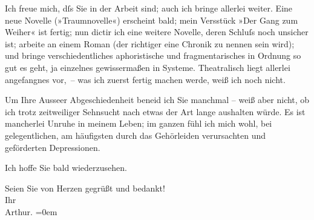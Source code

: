 \pstart
           Ich freue mich, dſs Sie in der Arbeit sind; auch ich bringe allerlei weiter. Eine
               neue Novelle (»Traumnovelle«) erscheint bald;
               mein Versstück »Der Gang zum Weiher« ist fertig;
               nun dictir ich eine weitere {\pb}Novelle, deren Schluſs noch
               unsicher ist; arbeite an einem Roman (der richtiger eine Chronik zu nennen sein wird); und bringe
               verschiedentliches aphoristische und fragmentarisches in Ordnung so gut es geht, ja einzelnes gewissermaßen in
                  Systeme. Theatralisch liegt
               allerlei angefangnes vor, – was ich zuerst fertig machen werde, weiß ich noch
               nicht.\pend
           
\pstart
           Um Ihre Ausseer Abgeschiedenheit beneid ich Sie
               manchmal – weiß aber nicht, ob ich  trotz
               zeitweiliger Sehnsucht nach etwas der Art lange aushalten würde. Es ist mancherlei
               Unruhe in meinem Leben; im ganzen fühl ich mich wohl, bei gelegentlichen, am
               häufigsten durch das Gehörleiden verursachten und geförderten Depressionen.\pend
           
\pstart
           Ich hoffe Sie bald wiederzusehen.\pend
           
\pstart
           Seien Sie von Herzen gegrüßt und bedankt!{\\[\baselineskip]}Ihr{\\[\baselineskip]}\spacefill\mbox{Arthur.}\pend
           \leftskip=0em{}\endnumbering{}  
      